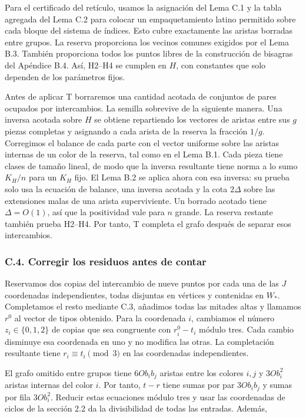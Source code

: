 \documentclass[spanish,11pt,a4paper]{article}
\begin{document}
Para el certificado del retículo, usamos la asignación del Lema C.1 y la tabla agregada del Lema C.2 para colocar un empaquetamiento latino permitido sobre cada bloque del sistema de índices. Esto cubre exactamente las aristas borradas entre grupos. La reserva proporciona los vecinos comunes exigidos por el Lema B.3. También proporciona todos los puntos libres de la construcción de bisagras del Apéndice B.4. Así, H2--H4 se cumplen en \(H\), con constantes que solo dependen de los parámetros fijos.

Antes de aplicar T borraremos una cantidad acotada de conjuntos de pares ocupados por intercambios. La semilla sobrevive de la siguiente manera. Una inversa acotada sobre \(H\) se obtiene repartiendo los vectores de aristas entre sus \(g\) piezas completas y asignando a cada arista de la reserva la fracción \(1/g\). Corregimos el balance de cada parte con el vector uniforme sobre las aristas internas de un color de la reserva, tal como en el Lema B.1. Cada pieza tiene clases de tamaño lineal, de modo que la inversa resultante tiene norma a lo sumo \(K_H/n\) para un \(K_H\) fijo. El Lema B.2 se aplica ahora con esa inversa: su prueba solo usa la ecuación de balance, una inversa acotada y la cota \(2\Delta\) sobre las extensiones malas de una arista superviviente. Un borrado acotado tiene \(\Delta=O(1)\), así que la positividad vale para \(n\) grande. La reserva restante también prueba H2--H4. Por tanto, T completa el grafo después de separar esos intercambios.

\subsubsection{C.4. Corregir los residuos antes de contar}\label{c.4.-corregir-los-residuos-antes-de-contar}

Reservamos dos copias del intercambio de nueve puntos por cada una de las \(J\) coordenadas independientes, todas disjuntas en vértices y contenidas en \(W_\ast\). Completamos el resto mediante C.3, añadimos todas las mitades altas y llamamos \(r^0\) al vector de tipos obtenido. Para la coordenada \(i\), cambiamos el número \(z_i\in\{0,1,2\}\) de copias que sea congruente con \(r^0_i-t_i\) módulo tres. Cada cambio disminuye esa coordenada en uno y no modifica las otras. La completación resultante tiene \(r_i\equiv t_i\pmod3\) en las coordenadas independientes.

El grafo omitido entre grupos tiene \(6O b_ib_j\) aristas entre los colores \(i,j\) y \(3O b_i^2\) aristas internas del color \(i\). Por tanto, \(t-r\) tiene sumas por par \(3O b_ib_j\) y sumas por fila \(3O b_i^2\). Reducir estas ecuaciones módulo tres y usar las coordenadas de ciclos de la sección 2.2 da la divisibilidad de todas las entradas. Además,
\end{document}

